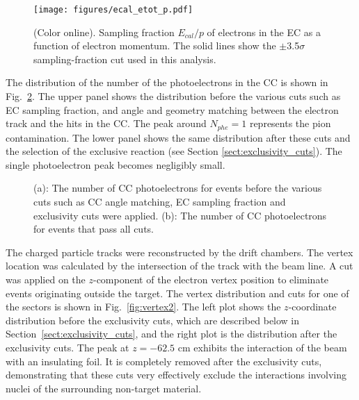 \documentclass[prc,floatfix,twocolumn,superscriptaddress,letter]{revtex4}
\begin{document}
\begin{figure}
\texttt{[image: figures/ecal\_etot\_p.pdf]} 
\caption{(Color online). 
Sampling fraction $E_{cal}/p$ of electrons in the EC as a function of electron momentum.
The solid lines show the $\pm$3.5$\sigma$ sampling-fraction cut used in this analysis. } 
\label{fig:ec_cut}
\end{figure}
 
The distribution of the number of the photoelectrons in the CC is shown in 
Fig.~\ref{fig:cc_match}. The upper panel shows the distribution before the various cuts such as EC sampling fraction, and angle  and geometry matching  between the electron track and the hits in the CC. The peak around
$N_{phe}=1$ represents the pion contamination. The lower panel shows the same distribution after these cuts and 
the selection of the exclusive reaction (see Section \ref{sect:exclusivity_cuts}).
The single photoelectron peak becomes negligibly small.

\begin{figure}
\centering
{}
\caption{
(a): The number of CC photoelectrons for events before the various cuts such as CC angle matching, EC sampling fraction and  exclusivity cuts were applied. (b): The number of CC photoelectrons for events that pass all cuts.}
\label{fig:cc_match}
\end{figure}

The charged particle tracks were reconstructed by the drift chambers. The vertex location was calculated by the intersection of the track with the beam line. 
 A cut was applied on the  $z$-component of the electron vertex  position to eliminate events  originating outside the target. The vertex distribution and cuts for one of the sectors is shown in Fig.~\ref{fig:vertex2}. The left plot shows the $z$-coordinate distribution before the exclusivity cuts, which are described below in Section~\ref{sect:exclusivity_cuts},  and the right plot  is the distribution after the exclusivity cuts. The peak at  $z=-62.5$ cm exhibits the interaction of the beam with an insulating foil.
 It is completely removed after the exclusivity cuts, demonstrating that these cuts very effectively exclude  the interactions involving nuclei of the surrounding non-target material.
\begin{figure*}
\caption{
The $z$-coordinate of the electron vertex. The vertical lines are the positions of the applied cuts. Note in (a) the small peak to the right of the target that is due to a foil placed at  $z=-62.5$ cm downstream of the target window.
In (b) the peak due to the foil is seen to disappear after the selection of the exclusive reaction.}
\label{fig:vertex2}
\end{figure*}
\end{document}
